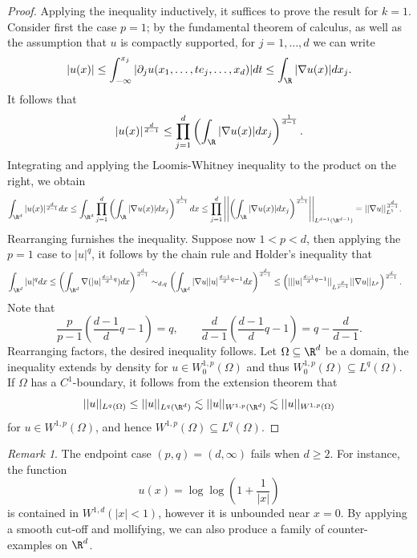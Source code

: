 \documentclass[reqno]{amsart}
\theoremstyle{definition}
\theoremstyle{remark}
\newtheorem*{remark}{Remark}
\begin{document}
\begin{proof}
	Applying the inequality inductively, it suffices to prove the result for $k = 1$. Consider first the case $p = 1$; by the fundamental theorem of calculus, as well as the assumption that $u$ is compactly supported, for $j = 1, \dots, d$ we can write
		\[ |u(x)| \leq \int_{-\infty}^{x_j} |\partial_j u(x_1, \dots, te_j, \dots, x_d)| dt \leq \int_{\R} |\nabla u (x)| dx_j.\]
	It follows that
		\[ |u(x)|^{\frac{d}{d - 1}} \leq \prod_{j = 1}^d \left( \int_{\R} |\nabla u (x)| dx_j \right)^{\frac{1}{d - 1}}. \]
	Integrating and applying the Loomis-Whitney inequality to the product on the right, we obtain
		\begin{align*}
			 \int_{\R^d} |u(x)|^{\frac{d}{d - 1}} dx 
			 	&\leq \int_{\R^d}  \prod_{j = 1}^d \left(  \int_{\R} |\nabla u (x)| dx_j \right)^{\frac{1}{d - 1}} dx \leq \prod_{j = 1}^d \left|\left| \left( \int_{\R} |\nabla u (x)| dx_j \right)^{\frac{1}{d - 1}}\right|\right|_{L^{d - 1} (\R^{d - 1})} = ||\nabla u||_{L^1}^{\frac{d}{d - 1}}.
		\end{align*}	 	
	Rearranging furnishes the inequality. Suppose now $1 < p < d$, then applying the $p = 1$ case to $|u|^q$, it follows by the chain rule and Holder's inequality that 
	\begin{align*}
		\int_{\R^d} |u|^q dx 
			&\leq \left( \int_{\R^d} \nabla (|u|^{\frac{d - 1}{d}q})dx \right)^{\frac{d}{d - 1}} \sim_{d, q} \left( \int_{\R^d} |\nabla u| |u|^{\frac{d - 1}{d}q - 1}dx \right)^{\frac{d}{d - 1}}  \leq \left( || |u|^{ \frac{d - 1}{d} q - 1}||_{L^{\frac{p}{p - 1}}} ||\nabla u||_{L^p}\right)^{\frac{d}{d - 1}}.
	\end{align*}
	Note that 
		\[ \frac{p}{p - 1} \left(\frac{d - 1}{d} q - 1 \right) = q, \qquad \frac{d}{d - 1} \left(\frac{d - 1}{d} q - 1 \right) = q - \frac{d}{d - 1}.\]
	Rearranging factors, the desired inequality follows. Let $\Omega \subseteq \R^d$ be a domain, the inequality extends by density for $u \in W^{1,p}_0 (\Omega)$ and thus $W^{1, p}_0 (\Omega) \subseteq L^q (\Omega)$. If $\Omega$ has a $C^1$-boundary, it follows from the extension theorem that
		\[ ||u||_{L^q (\Omega)} \leq ||u||_{L^q (\R^d)} \lesssim || u||_{W^{1 ,p} (\R^d)} \lesssim ||u||_{W^{1, p} (\Omega)} \]
	for $u \in W^{1, p} (\Omega)$, and hence $W^{1, p} (\Omega) \subseteq L^q (\Omega)$.
\end{proof}

\begin{remark}
	The endpoint case $(p, q) = (d, \infty)$ fails when $d \geq 2$. For instance, the function 
		\[ u(x) = \log \log \left(1 + \frac{1}{|x|} \right) \]
	is contained in $W^{1, d} (|x| < 1)$, however it is unbounded near $x = 0$. By applying a smooth cut-off and mollifying, we can also produce a family of counter-examples on $\R^d$. 
\end{remark}
\end{document}
